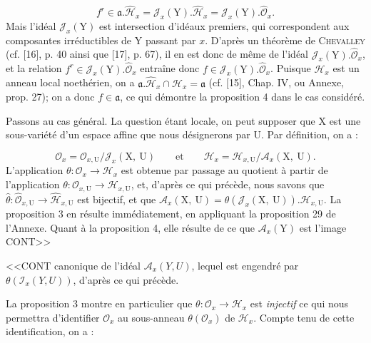 \begin{equation*}
f^r \in \mathfrak{a}.\hat{\mathcal{H}}_x = \mathcal{J}_x(\mathrm{Y}).\hat{\mathcal{H}}_x = \mathcal{J}_x(\mathrm{Y}).\hat{\mathcal{O}}_x.
\end{equation*}
Mais l'idéal $\mathcal{J}_x(\mathrm{Y})$ est intersection d'idéaux premiers, qui correspondent aux composantes irréductibles de $\mathrm{Y}$ passant par $x$. D'après un théorème de \textsc{Chevalley} (cf. [16], p. 40 ainsi que [17], p. 67), il en est donc de même de l'idéal $\mathcal{J}_x(\mathrm{Y}).\hat{\mathcal{O}}_x$, et la relation $f^r \in \mathcal{J}_x(\mathrm{Y}).\hat{\mathcal{O}}_x$ entraîne donc $f \in \mathcal{J}_x(\mathrm{Y}).\hat{\mathcal{O}}_x$. Puisque $\mathcal{H}_x$ est un anneau local noethérien, on a $\mathfrak{a}.\hat{\mathcal{H}}_x \cap \mathcal{H}_x = \mathfrak{a}$ (cf. [15], Chap. IV, ou Annexe, prop. 27); on a donc $f \in \mathfrak{a}$, ce qui démontre la proposition 4 dans le cas considéré.

Passons au cas général. La question étant locale, on peut supposer que $\mathrm{X}$ est une sous-variété d'un espace affine que nous désignerons par $\mathrm{U}$. Par définition, on a :

\begin{equation*}
\mathcal{O}_x = \mathcal{O}_{x,\mathrm{U}}/\mathcal{J}_x(\mathrm{X},\ \mathrm{U}) \qquad \mathrm{et} \qquad \mathcal{H}_x = \mathcal{H}_{x,\mathrm{U}}/\mathcal{A}_x(\mathrm{X},\ \mathrm{U}).
\end{equation*}
L'application $\theta : \mathcal{O}_x \to \mathcal{H}_x$ est obtenue par passage au quotient à partir de l'application $\theta : \mathcal{O}_{x,\mathrm{U}} \to \mathcal{H}_{x,\mathrm{U}}$, et, d'après ce qui précède, nous savons que $\hat{\theta} : \hat{\mathcal{O}}_{x,\mathrm{U}} \to \hat{\mathcal{H}}_{x,\mathrm{U}}$ est bijectif, et que $\mathcal{A}_x(\mathrm{X},\ \mathrm{U}) = \theta(\mathcal{J}_x(\mathrm{X},\ \mathrm{U})).\mathcal{H}_{x,\mathrm{U}}$. La proposition 3 en résulte immédiatement, en appliquant la proposition 29 de l'Annexe. Quant à la proposition 4, elle résulte de ce que $\mathcal{A}_x(\mathrm{Y})$ est l'image CONT>>



<<CONT canonique de l'idéal $\mathcal{A}_x(Y, U)$, lequel est engendré par $\theta(\mathcal{I}_x(Y, U))$, d'après ce qui précède.

La proposition 3 montre en particulier que $\theta : \mathcal{O}_x \to \mathcal{H}_x$ est \textit{injectif} ce qui nous permettra d'identifier $\mathcal{O}_x$ au sous-anneau $\theta(\mathcal{O}_x)$ de $\mathcal{H}_x$. Compte tenu de cette identification, on a :

